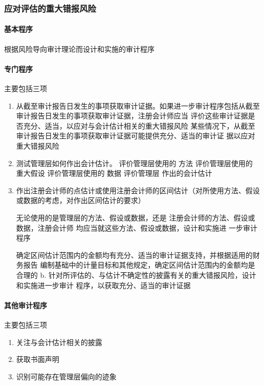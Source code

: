\documentclass[UTF8,12pt]{ctexart}
\numberwithin{equation}{section} %
\numberwithin{figure}{section}
\numberwithin{table}{section}
\begin{document}
	\subsubsection{应对评估的重大错报风险}
	\paragraph{基本程序}
	根据风险导向审计理论而设计和实施的审计程序
	
	\paragraph{专门程序}主要包括三项
	\begin{enumerate}
		\item 从截至审计报告日发生的事项获取审计证据。如果进一步审计程序包括从截至审计报告日发生的事项获取审计证据，注册会计师应当
		评价这些审计证据是否充分、适当，以应对与会计估计相关的重大错报风险
		某些情况下，从截至审计报告日发生的事项获取审计证据可能提供充分、适当的审计证
		据以应对重大错报风险
		
		\item 测试管理层如何作出会计估计。
		评价管理层使用的  方法
		评价管理层使用的  重大假设
		评价管理层使用的  数据
		评价管理层  作出的会计估计
		
		\item 作出注册会计师的点估计或使用注册会计师的区间估计（对所使用方法、假设或数据的考虑，对作出区间估计的要求）
		
		无论使用的是管理层的方法、假设或数据，还是
		注册会计师的方法、假设或数据，注册会计师
		均应当就这些方法、假设或数据，设计和实施进 一步审计程序
		
		确定区间估计范围内的金额均有充分、适当的审计证据支持，并根据适用的财务报告
		编制基础中的计量目标和其他规定，确定区间估计范围内的金额均是合理的 b.  针对所评估的、与估计不确定性的披露有关的重大错报风险，设计和实施进一步审计
		程序，以获取充分、适当的审计证据
	\end{enumerate}
	
	\paragraph{其他审计程序}主要包括三项
	\begin{enumerate}
		\item 关注与会计估计相关的披露
		
		\item 获取书面声明
		
		\item 识别可能存在管理层偏向的迹象
	\end{enumerate}
	
\end{document}
